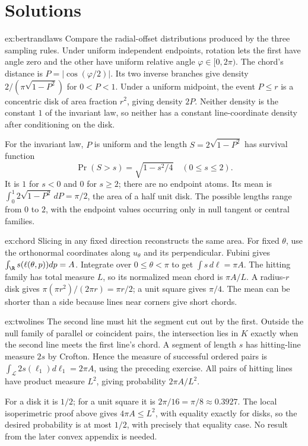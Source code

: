 \section{Solutions}

\begin{solution}{ex:bertrandlaws}
\idea Compare the radial-offset distributions produced by the three sampling rules.
\writeup Under uniform independent endpoints, rotation lets the first have angle zero and the other have uniform relative angle $\varphi\in[0,2\pi)$. The chord's distance is $P=|\cos(\varphi/2)|$. Its two inverse branches give density $2/(\pi\sqrt{1-P^2})$ for $0<P<1$. Under a uniform midpoint, the event $P\le r$ is a concentric disk of area fraction $r^2$, giving density $2P$. Neither density is the constant $1$ of the invariant law, so neither has a constant line-coordinate density after conditioning on the disk.

For the invariant law, $P$ is uniform and the length $S=2\sqrt{1-P^2}$ has survival function
\[
\Pr(S>s)=\sqrt{1-s^2/4}\quad(0\le s\le2).
\]
It is $1$ for $s<0$ and $0$ for $s\ge2$; there are no endpoint atoms. Its mean is
$\int_0^1 2\sqrt{1-P^2}\,dP=\pi/2$, the area of a half unit disk. The possible lengths range from $0$ to $2$, with the endpoint values occurring only in null tangent or central families.
\end{solution}

\begin{solution}{ex:chord}
\idea Slicing in any fixed direction reconstructs the same area.
\writeup For fixed $\theta$, use the orthonormal coordinates along $u_\theta$ and its perpendicular. Fubini gives $\int_{\R}s(\ell(\theta,p))dp=A$. Integrate over $0\le\theta<\pi$ to get $\int s\,d\ell=\pi A$. The hitting family has total measure $L$, so its normalized mean chord is $\pi A/L$. A radius-$r$ disk gives $\pi(\pi r^2)/(2\pi r)=\pi r/2$; a unit square gives $\pi/4$. The mean can be shorter than a side because lines near corners give short chords.
\end{solution}

\begin{solution}{ex:twolines}
\idea The second line must hit the segment cut out by the first.
\writeup Outside the null family of parallel or coincident pairs, the intersection lies in $K$ exactly when the second line meets the first line's chord. A segment of length $s$ has hitting-line measure $2s$ by Crofton. Hence the measure of successful ordered pairs is
$\int_{\mathcal L}2s(\ell_1)d\ell_1=2\pi A$, using the preceding exercise. All pairs of hitting lines have product measure $L^2$, giving probability $2\pi A/L^2$.

For a disk it is $1/2$; for a unit square it is $2\pi/16=\pi/8\approx0.3927$. The local isoperimetric proof above gives $4\pi A\le L^2$, with equality exactly for disks, so the desired probability is at most $1/2$, with precisely that equality case. No result from the later convex appendix is needed.
\end{solution}

